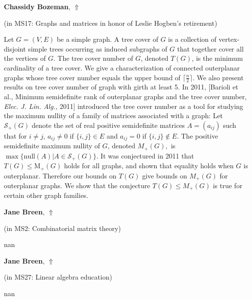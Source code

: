 \documentclass[ILAS2025-program.tex]{subfiles}
\begin{document}
     \hypertarget{down0222}{}\begin{ilasabstract}
    
    \textbf{Chassidy Bozeman},  \hfill \hyperlink{up0222}{$\Uparrow$}
    
    (in {\color{mstitle}MS17: Graphs and matrices in honor of Leslie Hogben's retirement})
        
        \mtskip
    Let $G=(V,E)$ be  a simple graph. A tree cover of $G$ is a collection of  vertex-disjoint simple trees occurring as induced subgraphs of $G$ that together cover all the vertices of $G$. The tree cover number of $G$, denoted $T(G)$, is the minimum cardinality of a tree cover. We give a characterization of connected outerplanar graphs whose tree cover number equals the upper bound of $\lceil \frac{n}{2} \rceil$.  We also present results on tree cover number of graph with girth at least 5. In 2011, [Barioli et al., Minimum semidefinite rank of outerplanar graphs and the tree cover number, {\em Elec. J. Lin. Alg.,} 2011] introduced the tree cover number as a tool for studying the maximum nullity of a family of matrices associated with a graph:  Let $\mathcal{S}_+(G)$ denote the set of real positive semidefinite matrices $A=(a_{ij})$ such that for $i\neq j$, $a_{ij}\neq 0$ if $\{i,j\}\in E$ and $a_{ij}=0$ if $\{i,j\}\notin E$. The positive semidefinite maximum  nullity of $G$, denoted $M_+(G),$ is $\max\{\text{null}(A)|A\in \mathcal{S}_+(G)\}.$ It was conjectured in 2011 that $T(G) \le \mathrm{M}_+(G)$ holds for all graphs, and shown that equality holds when $G$ is outerplanar.  Therefore our bounds on $T(G)$ give bounds on $M_+(G)$ for outerplanar graphs. We show that the conjecture $T(G)\leq M_+(G)$ is true for certain other graph families.
\end{ilasabstract}
     \hypertarget{down0032}{}\begin{ilasabstract}
    
    \textbf{Jane Breen},  \hfill \hyperlink{up0032}{$\Uparrow$}
    
    (in {\color{mstitle}MS2: Combinatorial matrix theory})
        
        \mtskip
    nan\end{ilasabstract}
     \hypertarget{down0332}{}\begin{ilasabstract}
    
    \textbf{Jane Breen},  \hfill \hyperlink{up0332}{$\Uparrow$}
    
    (in {\color{mstitle}MS27: Linear algebra education})
        
        \mtskip
    nan\end{ilasabstract}
\end{document}
